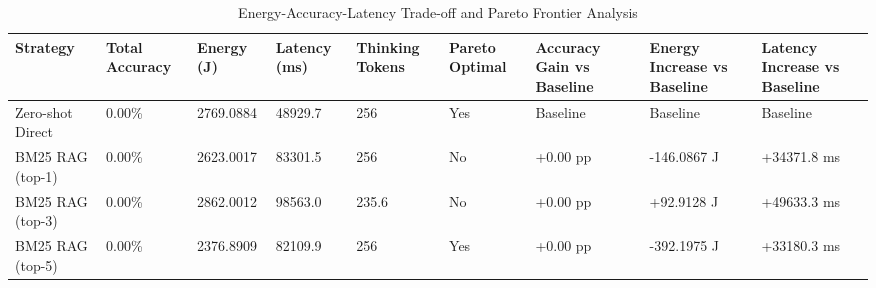 \begin{table}
\caption{Energy-Accuracy-Latency Trade-off and Pareto Frontier Analysis}
\label{tab:tradeoff_comparison}
\begin{tabular}{lllllllll}
\toprule
Strategy & Total Accuracy & Energy (J) & Latency (ms) & Thinking Tokens & Pareto Optimal & Accuracy Gain vs Baseline & Energy Increase vs Baseline & Latency Increase vs Baseline \\
\midrule
Zero-shot Direct & 0.00\% & 2769.0884 & 48929.7 & 256 & Yes & Baseline & Baseline & Baseline \\
BM25 RAG (top-1) & 0.00\% & 2623.0017 & 83301.5 & 256 & No & +0.00 pp & -146.0867 J & +34371.8 ms \\
BM25 RAG (top-3) & 0.00\% & 2862.0012 & 98563.0 & 235.6 & No & +0.00 pp & +92.9128 J & +49633.3 ms \\
BM25 RAG (top-5) & 0.00\% & 2376.8909 & 82109.9 & 256 & Yes & +0.00 pp & -392.1975 J & +33180.3 ms \\
\bottomrule
\end{tabular}
\end{table}
